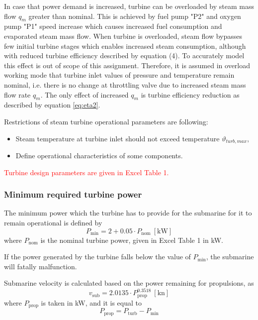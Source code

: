 \documentclass{article}
\begin{document}
	In case that power demand is increased, turbine can be overloaded by steam mass flow $q_m$ greater than nominal. This is achieved by fuel pump "P2" and oxygen pump "P1" speed increase which causes increased fuel consumption and evaporated steam mass flow. When turbine is overloaded, steam flow bypasses few initial turbine stages which enables increased steam consumption, although with reduced turbine efficiency described by equation (4). To accurately model this effect is out of scope of this assignment. Therefore, it is assumed in overload working mode that turbine inlet values of pressure and temperature remain nominal, i.e. there is no change at throttling valve due to increased steam mass flow rate $q_m$. The only effect of increased $q_m$ is turbine efficiency reduction as described by equation \ref{eq:eta2}.
	
	Restrictions of steam turbine operational parameters are following:
	
	\begin{itemize}
		\item Steam temperature at turbine inlet should not exceed temperature $\vartheta_{turb,max}$,
		\item Define operational characteristics of some components.
	\end{itemize}
	
	\noindent
	\textcolor{red}{Turbine design parameters are given in Excel Table 1.}

	\subsubsection*{Minimum required turbine power}
	
	The minimum power which the turbine has to provide for the submarine for it 
	to remain operational is defined by
	\begin{equation}\label{eq:minpower}
	P_\textrm{min} = 2 + 0.05 \cdot P_\textrm{nom} \ \left[\textrm{kW}\right]
	\end{equation}
	where $P_\textrm{nom}$ is the nominal turbine power, given in Excel Table 1 
	in kW.

	If the power generated by the turbine falls below the value of 
	$P_\textrm{min}$, the submarine will fatally malfunction.

	Submarine velocity is calculated based on the power remaining for 
	propulsions, as
	\begin{equation}
	v_\textrm{sub} = 2.0135 \cdot P_\textrm{prop}^{0.3518} \ 
	\left[\textrm{kn}\right]
	\end{equation}
	where $P_\textrm{prop}$ is taken in kW, and it is equal to
	\begin{equation}
	P_\textrm{prop} = P_\textrm{turb} - P_\textrm{min}
	\end{equation}
	
\end{document}
